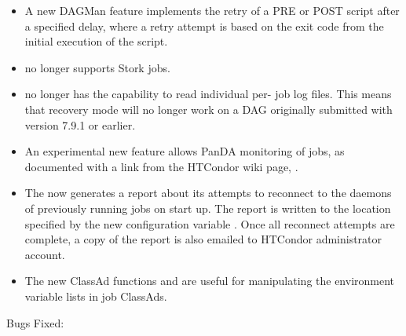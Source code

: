 \begin{itemize}
\item A new DAGMan feature implements the retry of a PRE or POST script 
after a specified delay, 
where a retry attempt is
based on the exit code from the initial execution of the script.

\item {} no longer supports Stork jobs.

\item {} no longer has the capability to read individual per-
job log files.  This means that recovery mode will no longer work on a
DAG originally submitted with version 7.9.1 or earlier.

\item An experimental new feature allows PanDA monitoring of jobs,
as documented with a link from the HTCondor wiki page,
.

\item The  now generates a report about its attempts to
reconnect to the  daemons of previously running jobs on start up.
The report is written to the location specified by the new configuration
variable .
Once all reconnect attempts are complete, a copy of the report is also
emailed to HTCondor administrator account.

\item The new ClassAd functions  and 
 are
useful for manipulating the environment variable lists in job ClassAds.

\end{itemize}

\noindent Bugs Fixed:

